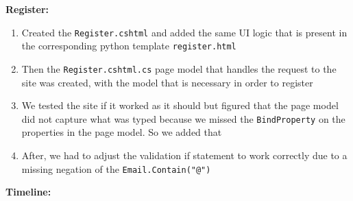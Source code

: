 \textbf{Register:}

\begin{enumerate}
    \item Created the \texttt{Register.cshtml} and added the same UI logic that is present in the corresponding python template \texttt{register.html}
    \item Then the \texttt{Register.cshtml.cs} page model that handles the request to the site was created, with the model that is necessary in order to register
    \item We tested the site if it worked as it should but figured that the page model did not capture what was typed because we missed the \texttt{BindProperty} on the properties in the page model. So we added that
    \item After, we had to adjust the validation if statement to work correctly due to a missing negation of the \texttt{Email.Contain("@")}
\end{enumerate}

\textbf{Timeline:}

